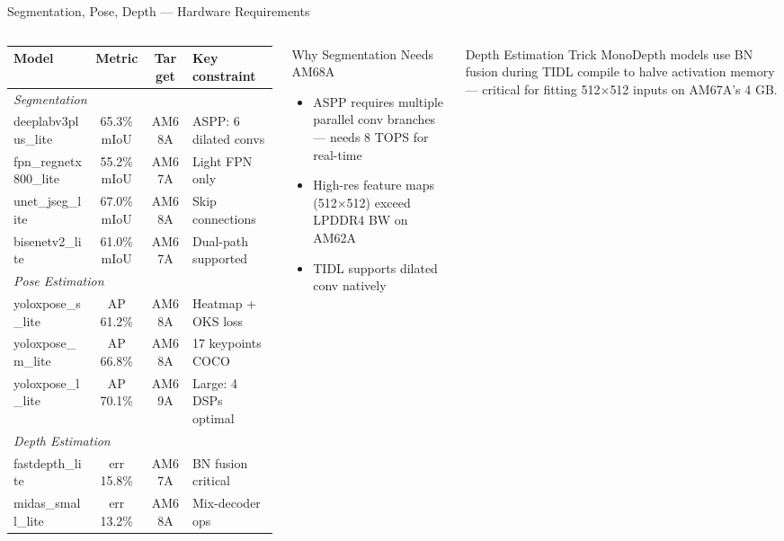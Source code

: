 \documentclass[aspectratio=169]{beamer}
\begin{document}
\begin{frame}{Segmentation, Pose, Depth --- Hardware Requirements}
\begin{columns}
\small
\begin{tabular}{lccl}
\toprule
\textbf{Model} & \textbf{Metric} & \textbf{Target} & \textbf{Key constraint}\\
\midrule
\multicolumn{4}{l}{\textit{Segmentation}}\\
deeplabv3plus\_lite   & 65.3\% mIoU & AM68A & ASPP: 6 dilated convs\\
fpn\_regnetx800\_lite & 55.2\% mIoU & AM67A & Light FPN only\\
unet\_jseg\_lite      & 67.0\% mIoU & AM68A & Skip connections\\
bisenetv2\_lite       & 61.0\% mIoU & AM67A & Dual-path supported\\
\midrule
\multicolumn{4}{l}{\textit{Pose Estimation}}\\
yoloxpose\_s\_lite & AP 61.2\% & AM68A & Heatmap + OKS loss\\
yoloxpose\_m\_lite & AP 66.8\% & AM68A & 17 keypoints COCO\\
yoloxpose\_l\_lite & AP 70.1\% & AM69A & Large: 4 DSPs optimal\\
\midrule
\multicolumn{4}{l}{\textit{Depth Estimation}}\\
fastdepth\_lite    & err 15.8\% & AM67A & BN fusion critical\\
midas\_small\_lite & err 13.2\% & AM68A & Mix-decoder ops\\
\bottomrule
\end{tabular}
\footnotesize
\begin{block}{Why Segmentation Needs AM68A}
\begin{itemize}
  \item ASPP requires multiple parallel conv branches --- needs 8 TOPS for real-time
  \item High-res feature maps (512$\times$512) exceed LPDDR4 BW on AM62A
  \item TIDL supports dilated conv natively
\end{itemize}
\end{block}
\begin{block}{Depth Estimation Trick}
MonoDepth models use BN fusion during TIDL compile to halve activation memory --- critical for fitting 512$\times$512 inputs on AM67A's 4 GB.
\end{block}
\end{columns}
\end{frame}
\end{document}
